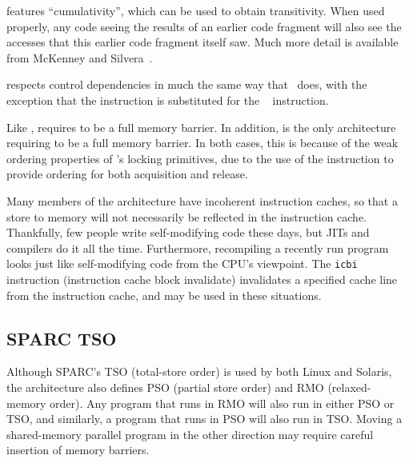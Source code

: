 \Power{} features ``cumulativity'', which can be used to obtain
transitivity.
When used properly, any code seeing the results of an earlier
code fragment will also see the accesses that this earlier code
fragment itself saw.
Much more detail is available from
McKenney and Silvera~\cite{PaulEMcKenneyN2745r2009}.

\Power{} respects control dependencies in much the same way that \ARM\
does, with the exception that the \Power{}  instruction
is substituted for the \ARM\ \co{ISB} instruction.

Like , \Power{} requires  to be
a full memory barrier.
In addition, \Power{} is the only architecture requiring
 to be a full memory barrier.
In both cases, this is because of the weak ordering properties
of \Power{}'s locking primitives, due to the use of the 
instruction to provide ordering for both acquisition and release.

Many members of the \Power{} architecture have incoherent instruction
caches, so that a store to memory will not necessarily be reflected
in the instruction cache.
Thankfully, few people write self-modifying code these days, but JITs
and compilers do it all the time.
Furthermore, recompiling a recently run program looks just like
self-modifying code from the CPU's viewpoint.
The {\tt icbi} instruction (instruction cache block invalidate)
invalidates a specified cache line from
the instruction cache, and may be used in these situations.

\subsection{SPARC TSO}

Although SPARC's TSO (total-store order) is used by both Linux and
Solaris, the architecture also defines PSO (partial store order) and RMO
(relaxed-memory order).
Any program that runs in RMO will also run in either PSO or TSO, and similarly,
a program that runs in PSO will also run in TSO.
Moving a shared-memory parallel program in the other direction may
require careful insertion of memory barriers.

